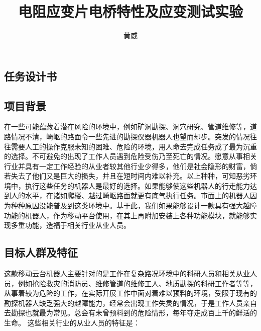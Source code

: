 \documentclass[12pt]{article}
\begin{document}
\begin{CJK}{UTF8}{song}        %
 \pagestyle{fancy}
 \lhead{}
 \chead{}
 \rfoot{\thepage}
 \renewcommand{\headrulewidth}{0.4pt}
 \renewcommand{\footrulewidth}{0.4pt}
 
\author{黄威}
\title{电阻应变片电桥特性及应变测试实验}

\renewcommand{\contentsname}{目录} %
\tableofcontents
\newpage


\section{任务设计书}


\subsection{项目背景}

在一些可能蕴藏着潜在风险的环境中，例如矿洞勘探、洞穴研究、管道维修等，道路情况不清，崎岖的路面令一些先进的勘探仪器机器人也望而却步。突发的情况往往需要人工的操作克服未知的困难、危险的环境，用人命去完成任务成了最为沉重的选择。不可避免的出现了工作人员遇到危险受伤乃至死亡的情况。愿意从事相关行业并具有一定工作经验的从业者较其他行业少得多，他们是社会隐形的财富，倘若失去了他们又是巨大的损失，并且在短时间内难以补充。以上种种，可知恶劣环境中，执行这些任务的机器人是最好的选择。如果能够使这些机器人的行走能力达到人的水平，在诸如爬楼、越过崎岖路面就更有底气执行任务。市面上的机器人因为种种原因没能普及到这类环境中。基于此，我们如果能够设计一款具有强大越障功能的机器人，作为移动平台使用，在其上再附加安装上各种功能模块，就能够实现多重功能，造福于相关行业从业人员。

\subsection{目标人群及特征}
\label{sec:fastguide}
这款移动云台机器人主要针对的是工作在复杂路况环境中的科研人员和相关从业人员，例如抢险救灾的消防员、维修管道的维修工人、地质勘探的科研工作者等等，从事着较为危险的工作，在实际开展工作中面对着难以预料的环境，受限于现有的勘探机器人缺乏强大的越障能力，经常会出现工作失灵的情况，于是工作人员亲自去勘探也就最为常见。总会有未曾预料到的危险情形，每年夺走成百上千的鲜活的生命。
这些相关行业的从业人员的特征是：


\end{CJK}
\end{document}
